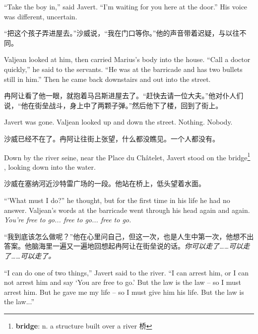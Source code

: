 \documentclass[fontset=ubuntu, zihao=5]{ctexart}
\begin{document}
\begin{paracol}{2}
\switchcolumn*

``Take the boy in,'' said Javert. ``I'm waiting for you here at the door.'' His voice was different, uncertain.


\switchcolumn

“把这个孩子弄进屋去。”沙威说，“我在门口等你。”他的声音带着迟疑，与以往不同。

\switchcolumn*

Valjean looked at him, then carried Marius's body into the house. ``Call a doctor quickly,'' he said to the servants. ``He was at the barricade and has two bullets still in him.'' Then he came back downstairs and out into the street.

\switchcolumn

冉阿让看了他一眼，就抱着马吕斯进屋去了。“赶快去请一位大夫。”他对仆人们说，“他在街垒战斗，身上中了两颗子弹。”然后他下了楼，回到了街上。

\switchcolumn*

Javert was gone. Valjean looked up and down the street. Nothing. Nobody.

\switchcolumn

沙威已经不在了。冉阿让往街上张望，什么都没瞧见。一个人都没有。

\switchcolumn*

\sectionbreak

Down by the river seine, near the Place du Châtelet, Javert stood on the
bridge\footnote{\textbf{bridge}: n. a structure built over a river 桥} ,
looking down into the water.

\switchcolumn

\sectionbreak

沙威在塞纳河近沙特雷广场的一段。他站在桥上，低头望着水面。

\switchcolumn*

``'What must I do?'' he thought, but for the first time in his life he had no answer. Valjean's words at the barricade went through his head again and again. \emph{You're free to go... free to go... free to go.}

\switchcolumn

“我到底该怎么做呢？”他在心里问自己，但这一次，也是人生中第一次，他想不出答案。他脑海里一遍又一遍地回想起冉阿让在街垒说的话。\emph{你可以走了……可以走了……可以走了。}

\switchcolumn*

``I can do one of two things,'' Javert said to the river. ``I can arrest him, or I can not arrest him and say `You are free to go.' But the law is the law – so I must arrest him. But he gave me my life – so I must give him his life. But the law is the law...''


\end{paracol}
\end{document}
